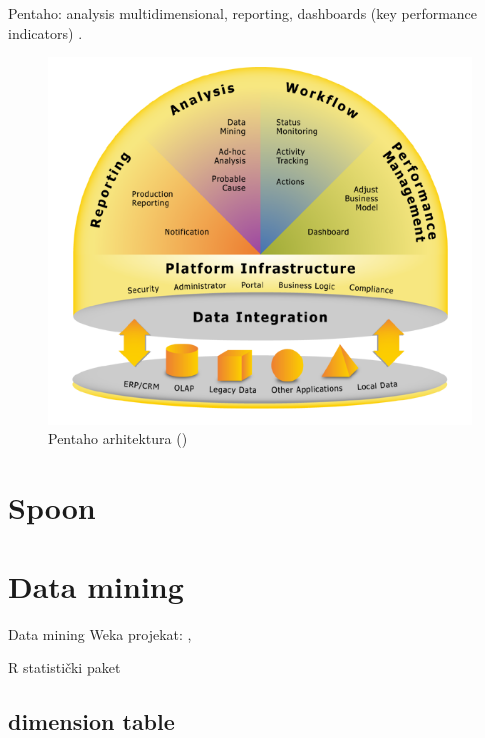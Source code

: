 \documentclass[times, utf8, seminar]{fit}
\begin{document}
Pentaho: analysis multidimensional, reporting, dashboards (key performance indicators) \cite[str.~7]{pentaho32}.

\begin{figure}[H]
\centering
\includegraphics[width=15cm]{img/pentaho_arhitektura_eric.png}
\caption{Pentaho arhitektura (\cite{web:eric})}
\end{figure}



\section{Spoon}



\section{Data mining}

Data mining Weka projekat: \cite{web:weka}, \cite{web:pentaho_weka}

R statistički paket \cite{web:r}

\subsection{dimension table}
\end{document}
